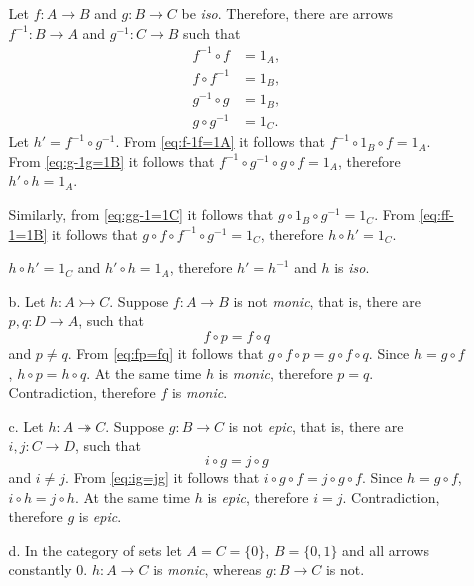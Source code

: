 \documentclass[12pt]{article}
\begin{document}
\begin{enumerate}
\begin{enumerate}

        Let $f : A \to B$ and $g : B \to C$ be \emph{iso}. Therefore, there are arrows $f^{-1} : B \to A$ and $g^{-1} : C \to B$ such that
        \begin{align}
          \label{eq:f-1f=1A} f^{-1} \circ f &= 1_A, \\
          \label{eq:ff-1=1C} f \circ f^{-1} &= 1_B, \\
          \label{eq:g-1g=1B} g^{-1} \circ g &= 1_B, \\
          \label{eq:gg-1=1C} g \circ g^{-1} &= 1_C. 
        \end{align}
        Let $h' = f^{-1} \circ g^{-1}$. From \ref{eq:f-1f=1A} it follows that $f^{-1} \circ 1_B \circ f = 1_A$. From \ref{eq:g-1g=1B} it follows that $f^{-1} \circ g^{-1} \circ g \circ f = 1_A$, therefore $h' \circ h = 1_A$.
        
        Similarly, from \ref{eq:gg-1=1C} it follows that $g \circ 1_B \circ g^{-1} = 1_C$. From \ref{eq:ff-1=1B} it follows that $g \circ f \circ f^{-1} \circ g^{-1} = 1_C$, therefore $h \circ h' = 1_C$.

        $h \circ h' = 1_C$ and $h' \circ h = 1_A$, therefore $h' = h^{-1}$ and $h$ is \emph{iso}.
      \item[b.]
        Let $h : A \rightarrowtail C$. Suppose $f : A \to B$ is not \emph{monic}, that is, there are $p, q : D \to A$, such that
        \begin{equation}
          \label{eq:fp=fq}
          f \circ p = f \circ q
        \end{equation}
        and $p \neq q$. From \ref{eq:fp=fq} it follows that $g \circ f \circ p = g \circ f \circ q$. Since $h = g \circ f$, $h \circ p = h \circ q$. At the same time $h$ is \emph{monic}, therefore $p = q$. Contradiction, therefore $f$ is \emph{monic}.
      \item[c.]  
        Let $h : A \twoheadrightarrow C$. Suppose $g : B \to C$ is not \emph{epic}, that is, there are $i, j : C \to D$, such that
        \begin{equation}
          \label{eq:ig=jg}
          i \circ g = j \circ g
        \end{equation}
        and $i \neq j$. From \ref{eq:ig=jg} it follows that $i \circ g \circ f = j \circ g \circ f$. Since $h = g \circ f$, $i \circ h = j \circ h$. At the same time $h$ is \emph{epic}, therefore $i = j$. Contradiction, therefore $g$ is \emph{epic}.
      \item[d.]
        In the category of sets let $A = C = \{0\}$, $B = \{0, 1\}$ and all arrows constantly $0$. $h : A \to C$ is \emph{monic}, whereas $g : B \to C$ is not.
    \end{enumerate}


\end{enumerate}
\end{document}
